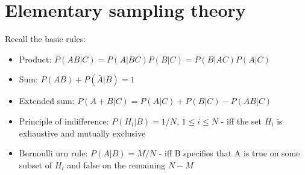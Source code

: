\documentclass[../jaynes_prob_theory_notes.tex]{subfiles}
\begin{document}
\section{Elementary sampling theory}
Recall the basic rules:
    \begin{itemize}
        \item Product: $P(AB|C) = P(A|BC)P(B|C) = P(B|AC)P(A|C)$
        \item Sum: $P(AB) + P(\bar{A}|B) = 1$
        \item Extended sum: $P(A + B|C) = P(A|C) + P(B|C) - P(AB|C)$
        \item Principle of indifference: $P(H_i|B) = 1/N$, $1 \leq i \leq N$
          - iff the set $H_i$ is exhaustive and mutually exclusive
        \item Bernoulli urn rule: $P(A|B) = M/N$
          - iff B specifies that A is true on some subset of $H_i$ and false on the remaining $N-M$ 
    \end{itemize}
    
\end{document}
